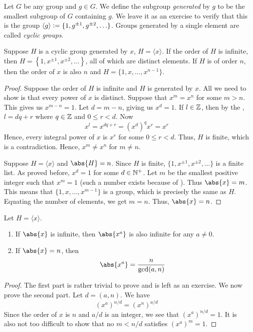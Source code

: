 Let $G$ be any group and $g \in G$. We define the subgroup \emph{generated} by $g$ to be the smallest subgroup of $G$ containing $g$. We leave it as an exercise to verify that this is the group $\langle g \rangle \vcentcolon= \{ 1, g^{\pm 1}, g^{\pm 2}, \ldots \}$. Groups generated by a single element are called \emph{cyclic groups}.

\begin{prop} \label{prop:cyclic-structure}
    Suppose $H$ is a cyclic group generated by $x$, $H = \langle x \rangle$. If the order of $H$ is infinite, then $H = \left\{ 1, x^{\pm 1}, x^{\pm 2}, \ldots \right\}$, all of which are distinct elements. If $H$ is of order $n$, then the order of $x$ is also $n$ and $H = \{ 1, x, \ldots , x^{n-1} \}$.
\end{prop}
\begin{proof}
    Suppose the order of $H$ is infinite and $H$ is generated by $x$. All we need to show is that every power of $x$ is distinct. Suppose that $x^m = x^n$ for some $m > n$. This gives us $x^{m-n} = 1$. Let $d = m-n$, giving us $x^d = 1$. If $l \in \mathbb{Z}$, then by the , $l = dq + r$ where $q \in \mathbb{Z}$ and $0 \leq r < d$. Now
    \[
        x^l = x^{dq+r} = (x^d)^q x^r = x^r
    \]
    Hence, every integral power of $x$ is $x^r$ for some $0 \leq r < d$. Thus, $H$ is finite, which is a contradiction. Hence, $x^m \neq x^n$ for $m \neq n$.
    
    \medskip
    
    Suppose $H = \langle x \rangle$ and $\abs{H} = n$. Since $H$ is finite, $\{1, x^{\pm 1}, x^{\pm 2}, \ldots\}$ is a finite list. As proved before, $x^d = 1$ for some $d \in \mathbb{N}^+$. Let $m$ be the smallest positive integer such that $x^m = 1$ (such a number exists because of ). Thus $\abs{x} = m$. This means that $\{1, x,\ldots, x^{m-1}\}$ is a group, which is precisely the same as $H$. Equating the number of elements, we get $m = n$. Thus, $\abs{x} = n$.
\end{proof}

\begin{prop} \label{prop:order_xa}
    Let $H = \langle x \rangle$. 
    \begin{enumerate}
        \item If $\abs{x}$ is infinite, then $\abs{x^a}$ is also infinite for any $a \neq 0$.
        \item If $\abs{x} = n$, then 
        \[
            \abs{x^a} = \frac{n}{\gcd(a,n)}
        \]
    \end{enumerate}
\end{prop}
\begin{proof} 
    The first part is rather trivial to prove and is left as an exercise. We now prove the second part. Let $d = (a,n)$. We have
    \[
        \left( x^a \right)^{n/d} = \left( x^n \right)^{a/d}
    \]
    Since the order of $x$ is $n$ and $a/d$ is an integer, we see that $\left( x^a \right)^{n/d} = 1$. It is also not too difficult to show that no $m < n/d$ satisfies $(x^a)^m = 1$.
\end{proof}


